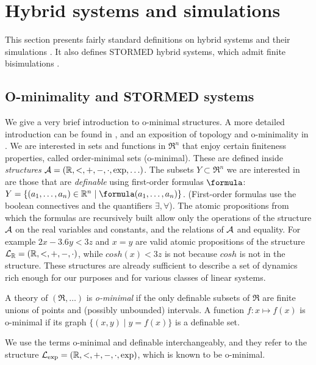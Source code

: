 \section{Hybrid systems and simulations}
\label{sec:preliminaries}

This section presents fairly standard definitions on 
hybrid systems and their simulations \cite{AlurHLP00ieee}.
It also defines STORMED hybrid systems, which admit finite bisimulations \cite{VladimerouPVD08_STORMED}.




\subsection{O-minimality and STORMED systems}
\label{sec:ominimality}
We give a very brief introduction to o-minimal structures.
A more detailed introduction can be found in \cite{LaFerrierePS00_Ominimal}, and an exposition of topology and o-minimality in \cite{VanDerDriesBook}.
We are interested in sets and functions in $\Re^n$ that enjoy certain finiteness properties, called order-minimal sets (o-minimal).
These are defined inside \emph{structures} $\mathcal{A} = (\mathbb{R},<, +,-,\cdot,\exp,\ldots)$.
The subsets $Y \subset \Re^n$ we are interested in are those that are \emph{definable} using first-order formulas $\formula$: $Y = \{(a_1,\ldots,a_n) \in \Re^n \;|\;  \formula(a_1,\ldots,a_n)\}$.
(First-order formulas use the boolean connectives and the quantifiers $\exists,\forall$).
The atomic propositions from which the formulas are recursively built allow only the operations of the structure $\mathcal{A}$ on the real variables and constants, and the relations of $\mathcal{A}$ and equality.
For example $2x-3.6y < 3z$ and $x=y$ are valid atomic propositions of the structure $\mathcal{L}_{\mathbb{R}}=(\mathbb{R},<, +,-,\cdot)$, while $cosh(x) < 3z$ is not because $cosh$ is not in the structure.
These structures are already sufficient to describe a set of dynamics rich enough for our purposes and for various classes of linear systems.
%
\begin{defn}
	\label{defn:ominimal struct}	
	A theory of $(\Re,\ldots)$ is \emph{o-minimal} if the only definable subsets of $\Re$ are finite unions of points and (possibly unbounded) intervals.	
	A function $f:x \mapsto f(x)$ is o-minimal if its graph $\{(x,y) \;|\; y=f(x)\}$ is a definable set.
\end{defn}
We use the terms o-minimal and definable interchangeably, and they refer to the structure $\mathcal{L}_{\exp}= (\mathbb{R},<, +,-,\cdot,\exp)$, which is known to be o-minimal.
